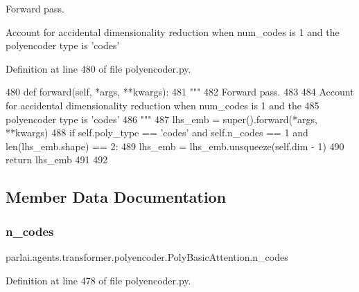 \begin{DoxyVerb}Forward pass.

Account for accidental dimensionality reduction when num_codes is 1 and the
polyencoder type is 'codes'
\end{DoxyVerb}
 

Definition at line 480 of file polyencoder.\+py.


\begin{DoxyCode}
480     \textcolor{keyword}{def }forward(self, *args, **kwargs):
481         \textcolor{stringliteral}{"""}
482 \textcolor{stringliteral}{        Forward pass.}
483 \textcolor{stringliteral}{}
484 \textcolor{stringliteral}{        Account for accidental dimensionality reduction when num\_codes is 1 and the}
485 \textcolor{stringliteral}{        polyencoder type is 'codes'}
486 \textcolor{stringliteral}{        """}
487         lhs\_emb = super().forward(*args, **kwargs)
488         \textcolor{keywordflow}{if} self.poly\_type == \textcolor{stringliteral}{'codes'} \textcolor{keywordflow}{and} self.n\_codes == 1 \textcolor{keywordflow}{and} len(lhs\_emb.shape) == 2:
489             lhs\_emb = lhs\_emb.unsqueeze(self.dim - 1)
490         \textcolor{keywordflow}{return} lhs\_emb
491 
492 
\end{DoxyCode}


\subsection{Member Data Documentation}
\mbox{\label{classparlai_1_1agents_1_1transformer_1_1polyencoder_1_1PolyBasicAttention_a45603a52525744549d48b10e0bd1b63c}} 
\subsubsection{\texorpdfstring{n\+\_\+codes}{n\_codes}}
{\footnotesize\ttfamily parlai.\+agents.\+transformer.\+polyencoder.\+Poly\+Basic\+Attention.\+n\+\_\+codes}



Definition at line 478 of file polyencoder.\+py.

